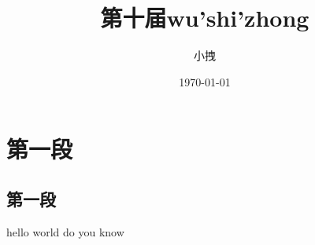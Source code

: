 \documentclass{article}
\title{第十届wu'shi'zhong}
\date{\today}
\author{小拽}
\begin{document}
\maketitle
\section{第一段}
\subsection{第一段}
hello world do you know
\end{document}
